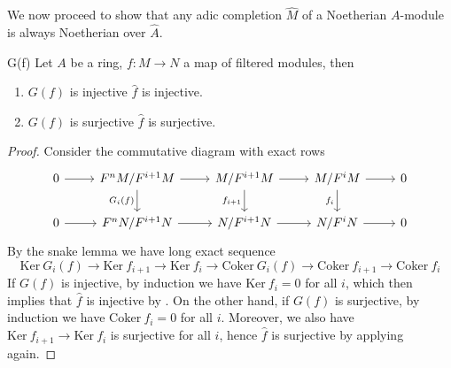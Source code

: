 \documentclass[10pt]{extarticle}
\begin{document}
We now proceed to show that any adic completion $\widehat{M}$ of a Noetherian $A$-module is always Noetherian over $\widehat{A}$.

\begin{lemma}{}{G(f)}
    Let $A$ be a ring, $f\colon M\to N$ a map of filtered modules, then
    \begin{enumerate}
        \item $G(f)$ is injective \implies $\widehat{f}$ is injective.
        \item $G(f)$ is surjective \implies $\widehat{f}$ is surjective.
    \end{enumerate}
\end{lemma}
\begin{proof}
    Consider the commutative diagram with exact rows
    \[\begin{tikzcd}
	0 & {F^nM/F^{i+1}M} & {M/F^{i+1}M} & {M/F^iM} & 0 \\
	0 & {F^nN/F^{i+1}N} & {N/F^{i+1}N} & {N/F^iN} & 0
	\arrow[from=1-1, to=1-2]
	\arrow[from=1-2, to=1-3]
	\arrow["{G_i(f)}"', from=1-2, to=2-2]
	\arrow[from=1-3, to=1-4]
	\arrow["{f_{i+1}}"', from=1-3, to=2-3]
	\arrow[from=1-4, to=1-5]
	\arrow["{f_i}"', from=1-4, to=2-4]
	\arrow[from=2-1, to=2-2]
	\arrow[from=2-2, to=2-3]
	\arrow[from=2-3, to=2-4]
	\arrow[from=2-4, to=2-5]
    \end{tikzcd}\]
    By the snake lemma we have long exact sequence
    \[
    \text{Ker}\ G_i(f)\to\text{Ker}\ f_{i+1}\to\text{Ker}\ f_i\to\text{Coker}\ G_i(f)\to\text{Coker}\ f_{i+1}\to\text{Coker}\ f_i
    \]
    If $G(f)$ is injective, by induction we have $\text{Ker}\ f_i=0$ for all $i$, which then implies that $\widehat{f}$ is injective by . On the other hand, if $G(f)$ is surjective, by induction we have $\text{Coker}\ f_i=0$ for all $i$. Moreover, we also have $\text{Ker}\ f_{i+1}\to\text{Ker}\ f_i$ is surjective for all $i$, hence $\widehat{f}$ is surjective by applying  again.
\end{proof}
\end{document}
